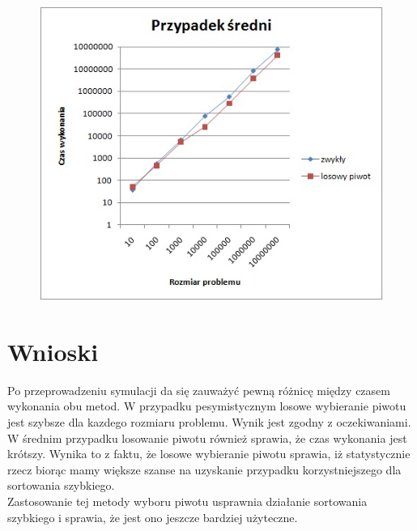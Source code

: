 \documentclass[10pt,oneside]{mwbk}
\begin{document}
	\begin{figure}[!h]
	\centering
	\includegraphics[scale=0.7]{rys/srednio.jpg}
	\end{figure}
\newpage
\section {Wnioski}
\indent Po przeprowadzeniu symulacji da się zauważyć pewną różnicę między czasem wykonania obu metod.
W przypadku pesymistycznym losowe wybieranie piwotu jest szybsze dla kazdego rozmiaru problemu. Wynik jest zgodny z oczekiwaniami. 
\indent W średnim przypadku losowanie piwotu również sprawia, że czas wykonania jest krótszy. Wynika to z faktu, że losowe wybieranie piwotu sprawia, iż statystycznie rzecz biorąc mamy większe szanse na uzyskanie przypadku korzystniejszego dla sortowania szybkiego. \\
\indent Zastosowanie tej metody wyboru piwotu usprawnia działanie sortowania szybkiego i sprawia, że jest ono jeszcze bardziej użyteczne. 
\end{document}
